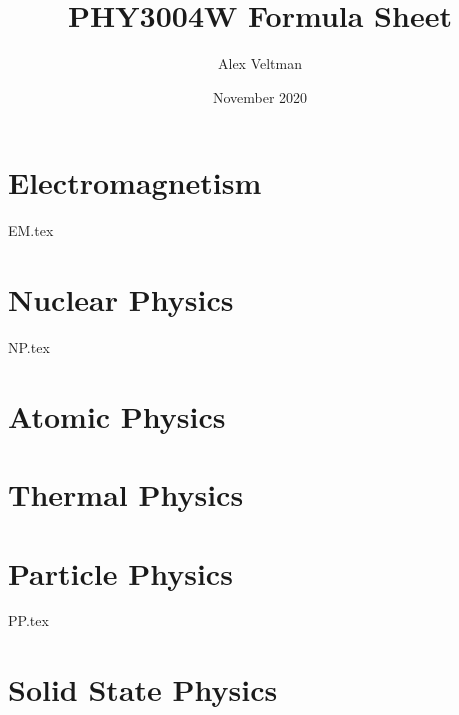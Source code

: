 \documentclass[a4paper, twocolumn]{article}
\title{PHY3004W Formula Sheet}
\author{Alex Veltman}
\date{November 2020}
\makeatletter
\numberwithin{equation}{section}
\renewcommand{\maketitle} %
{ \begingroup \vskip 10pt \begin{center} \large {\bf \@title}
	\vskip 10pt \large \@author \hskip 20pt \@date \end{center}
  \vskip 10pt \endgroup \setcounter{footnote}{0} }
\makeatother
\begin{document}
\maketitle

\section{Electromagnetism}
{EM.tex}

\section{Nuclear Physics}
{NP.tex}

\section{Atomic Physics}

\section{Thermal Physics}

\section{Particle Physics}
{PP.tex}

\section{Solid State Physics}
\end{document}
